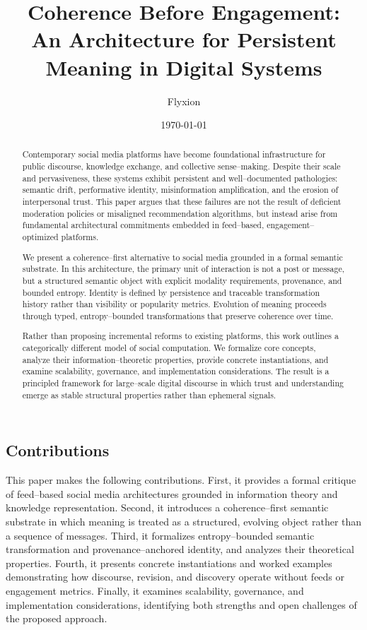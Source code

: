 \documentclass[11pt]{article}
\title{Coherence Before Engagement:\\
An Architecture for Persistent Meaning in Digital Systems}
\author{Flyxion}
\date{\today}
\begin{document}
\maketitle

\begin{abstract}
Contemporary social media platforms have become foundational infrastructure for public
discourse, knowledge exchange, and collective sense--making. Despite their scale and
pervasiveness, these systems exhibit persistent and well--documented pathologies:
semantic drift, performative identity, misinformation amplification, and the erosion of
interpersonal trust. This paper argues that these failures are not the result of deficient
moderation policies or misaligned recommendation algorithms, but instead arise from
fundamental architectural commitments embedded in feed--based, engagement--optimized
platforms.

We present a coherence--first alternative to social media grounded in a formal semantic
substrate. In this architecture, the primary unit of interaction is not a post or message,
but a structured semantic object with explicit modality requirements, provenance, and
bounded entropy. Identity is defined by persistence and traceable transformation history
rather than visibility or popularity metrics. Evolution of meaning proceeds through
typed, entropy--bounded transformations that preserve coherence over time.

Rather than proposing incremental reforms to existing platforms, this work outlines a
categorically different model of social computation. We formalize core concepts, analyze
their information--theoretic properties, provide concrete instantiations, and examine
scalability, governance, and implementation considerations. The result is a principled
framework for large--scale digital discourse in which trust and understanding emerge as
stable structural properties rather than ephemeral signals.
\end{abstract}

\subsection{Contributions}

This paper makes the following contributions. First, it provides a formal critique of
feed--based social media architectures grounded in information theory and knowledge
representation. Second, it introduces a coherence--first semantic substrate in which
meaning is treated as a structured, evolving object rather than a sequence of messages.
Third, it formalizes entropy--bounded semantic transformation and provenance--anchored
identity, and analyzes their theoretical properties. Fourth, it presents concrete
instantiations and worked examples demonstrating how discourse, revision, and discovery
operate without feeds or engagement metrics. Finally, it examines scalability,
governance, and implementation considerations, identifying both strengths and open
challenges of the proposed approach.
\end{document}
